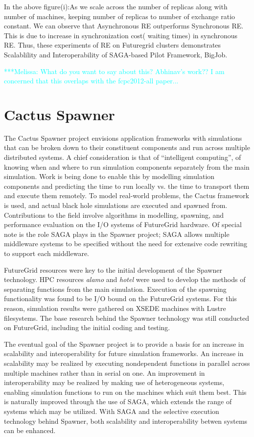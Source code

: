 \documentclass[]{paper}
\newcommand{\mrnote}[1]{ {\textcolor{cyan} { ***Melissa: #1 }}}
\newcommand{\mrnote}[1]{}
\begin{document}
In the above figure(i):As we scale across the number of replicas along with number of machines, keeping number of replicas to number of exchange ratio constant. We can observe that Asynchronous RE outperforms Synchronous RE. This is due to increase in synchronization cost( waiting times) in synchronous RE. Thus, these experiments of RE on Futuregrid clusters demonstrates Scalablility and Interoperability of SAGA-based Pilot Framework, BigJob.

\mrnote{What do you want to say about this? Abhinav's work?? I am concerned that this overlaps with the fcpc2012-all paper...}

\section{Cactus Spawner}
The Cactus Spawner project envisions application frameworks with simulations that
can be broken down to their constituent components and run across multiple
distributed systems.  A chief consideration is that of ``intelligent computing'',
of knowing when and where to run simulation components separately from the main
simulation.  Work is being done to enable this by modelling simulation components
and predicting the time to run locally vs. the time to transport them and execute
them remotely.  To model real-world problems, the Cactus framework is used, and
actual black hole simulations are executed and spawned from.  Contributions
to the field involve algorithms in modelling, spawning, and performance evaluation on
the I/O systems of FutureGrid hardware.  Of special note is the role SAGA plays in the
Spawner project; SAGA allows multiple middleware systems to be specified without the need
for extensive code rewriting to support each middleware.

FutureGrid resources were key to the initial development of the Spawner technology.
HPC resources \textit{alamo} and \textit{hotel} were used to develop the methods of separating functions
from the main simulation.  Execution of the spawning functionality was found to be I/O
bound on the FutureGrid systems.  For this reason, simulation results were gathered
on XSEDE machines with Lustre filesystems.  The base research behind the Spawner technology
was still conducted on FutureGrid, including the initial coding and testing.

The eventual goal of the Spawner project is to provide a basis for an increase in
scalability and interoperability for future simulation frameworks.  An increase in scalability
may be realized by executing nondependent functions in parallel across multiple machines rather
than in serial on one.  An improvement in interoperability may be realized by making use of heterogeneous systems,
enabling simulation functions to run on the machines which suit them best.  This is naturally improved through
the use of SAGA, which extends the range of systems which may be utilized.  With SAGA and the
selective execution technology behind Spawner, both scalability and interoperability betwen systems
can be enhanced.
\end{document}
